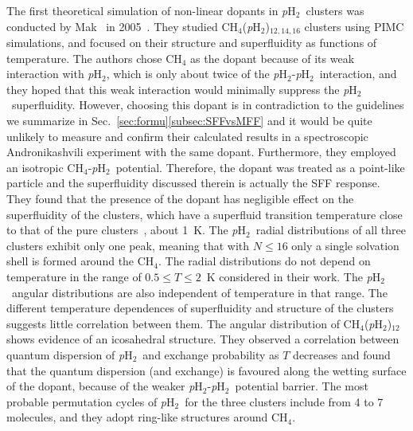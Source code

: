 \documentclass[12pt]{iopart}
\newcommand{\phtwo}{{\em p}H$_2$}
\begin{document}
The first theoretical  simulation of non-linear dopants in  \phtwo~clusters was conducted by Mak \etal~in 2005~\cite{mak_ch4_h2}. They studied CH$_4$(\phtwo)$_{12,14,16}$ clusters using PIMC simulations, and focused on their structure and superfluidity as functions of temperature. 
The authors chose CH$_4$ as the dopant because of its weak interaction with \phtwo, which is only about twice of the \phtwo-\phtwo~interaction, and they hoped that this weak interaction would minimally suppress the \phtwo~superfluidity. 
However, choosing this dopant is in contradiction to the guidelines we summarize in Sec.~\ref{sec:formu}\ref{subsec:SFFvsMFF} and it would be quite unlikely to measure and confirm their calculated results in a spectroscopic Andronikashvili experiment with the same dopant. Furthermore, they employed an isotropic CH$_4$-\phtwo~potential. 
Therefore, the dopant was treated as a point-like particle and the superfluidity discussed therein is actually the SFF response. 
They found that the presence of the dopant has negligible effect on the superfluidity of the clusters, which have a superfluid transition temperature close to that of the pure clusters~\cite{sindzingre_pH2_superfluid}, about 1~K. 
The \phtwo~radial distributions of all three clusters exhibit only one peak, meaning that with $N\le 16$ only a single solvation shell is formed around the CH$_4$. 
The radial distributions do not depend on temperature in the range of $0.5\le T\le 2$~K considered in their work.
The \phtwo~angular distributions are also independent of temperature in that range. 
The different temperature dependences of superfluidity and structure of the clusters suggests little correlation between them. 
The angular distribution of CH$_4$(\phtwo)$_{12}$ shows evidence of an icosahedral structure. 
They observed a correlation between quantum dispersion of \phtwo~and exchange probability as $T$ decreases and found that the quantum dispersion (and exchange) is favoured along the wetting surface of the dopant, because of the weaker \phtwo-\phtwo~potential barrier. 
The most probable permutation cycles of \phtwo~for the three clusters include from 4 to 7 molecules, and they adopt ring-like structures around CH$_4$.
\end{document}
